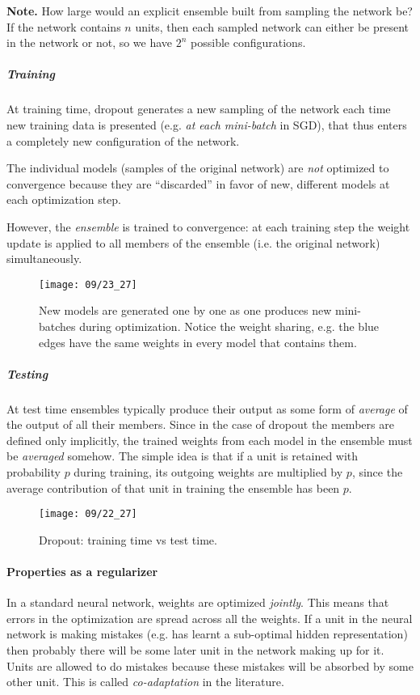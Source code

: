 \textbf{Note.} How large would an explicit ensemble built from sampling the network be? If the network contains $n$ units, then each sampled network can either be present in the network or not, so we have $2^n$ possible configurations.

\subparagraph{Training} 

At training time, dropout generates a new sampling of the network each time new training data is presented (e.g. \emph{at each mini-batch} in SGD), that thus enters a completely new configuration of the network.

The individual models (samples of the original network) are \emph{not} optimized to convergence because they are ``discarded'' in favor of new, different models at each optimization step. 

However, the \emph{ensemble} is trained to convergence: at each training step the weight update is applied to all members of the ensemble (i.e. the original network) simultaneously.

\begin{figure}[H]
    \centering
    \texttt{[image: 09/23\_27]}
    \caption{New models are generated one by one as one produces new mini-batches during optimization. Notice the weight sharing, e.g. the blue edges have the same weights in every model that contains them.}	
\end{figure}
    
\subparagraph{Testing}

At test time ensembles typically produce their output as some form of \emph{average} of the output of all their members. 
Since in the case of dropout the members are defined only implicitly, the trained weights from each model in the ensemble must be \emph{averaged} somehow. The simple idea is that if a unit is retained with probability $p$ during training, its outgoing weights are multiplied by $p$, since the average contribution of that unit in training the ensemble has been $p$.
\begin{figure}[H]
    \centering
    \texttt{[image: 09/22\_27]}
    \caption{Dropout: training time vs test time.}	
\end{figure}

\paragraph{Properties as a regularizer}

In a standard neural network, weights are optimized \emph{jointly}. This
means that errors in the optimization are spread across all the weights. If 
a unit in the neural network is making mistakes (e.g. has learnt a sub-optimal hidden representation) then probably there will be some later unit in the network making up for it. Units are allowed to do mistakes because these mistakes will be absorbed by some other unit. This is called \emph{co-adaptation} in the literature. 

